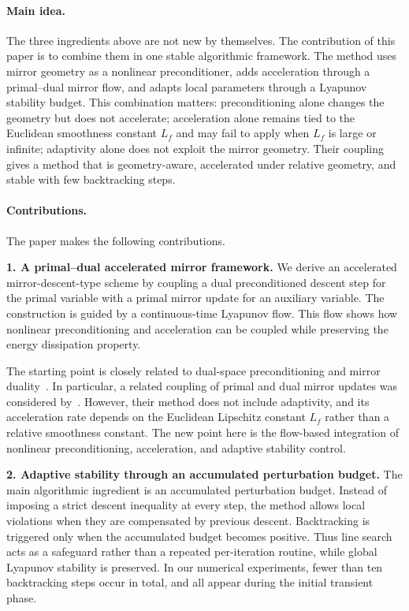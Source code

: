 \documentclass{article}
\theoremstyle{plain}
\theoremstyle{definition}
\theoremstyle{remark}
\begin{document}
\paragraph{Main idea.}
The three ingredients above are not new by themselves. The contribution of this paper is to combine them in one stable algorithmic framework. The method uses mirror geometry as a nonlinear preconditioner, adds acceleration through a primal--dual mirror flow, and adapts local parameters through a Lyapunov stability budget. This combination matters: preconditioning alone changes the geometry but does not accelerate; acceleration alone remains tied to the Euclidean smoothness constant $L_f$ and may fail to apply when $L_f$ is large or infinite; adaptivity alone does not exploit the mirror geometry. Their coupling gives a method that is geometry-aware, accelerated under relative geometry, and stable with few backtracking steps.

\paragraph{Contributions.}
The paper makes the following contributions.

\noindent\textbf{1. A primal--dual accelerated mirror framework.}
We derive an accelerated mirror-descent-type scheme by coupling a dual preconditioned descent step for the primal variable with a primal mirror update for an auxiliary variable. The construction is guided by a continuous-time Lyapunov flow. This flow shows how nonlinear preconditioning and acceleration can be coupled while preserving the energy dissipation property.

The starting point is closely related to dual-space preconditioning and mirror duality~\cite{maddison2021dual,laude2025anisotropic,kim2023mirror}. In particular, a related coupling of primal and dual mirror updates was considered by~\citet{kim2023mirror}. However, their method does not include adaptivity, and its acceleration rate depends on the Euclidean Lipschitz constant $L_f$ rather than a relative smoothness constant. The new point here is the flow-based integration of nonlinear preconditioning, acceleration, and adaptive stability control.

\noindent\textbf{2. Adaptive stability through an accumulated perturbation budget.}
The main algorithmic ingredient is an accumulated perturbation budget. Instead of imposing a strict descent inequality at every step, the method allows local violations when they are compensated by previous descent. Backtracking is triggered only when the accumulated budget becomes positive. Thus line search acts as a safeguard rather than a repeated per-iteration routine, while global Lyapunov stability is preserved. In our numerical experiments, fewer than ten backtracking steps occur in total, and all appear during the initial transient phase.
\end{document}
